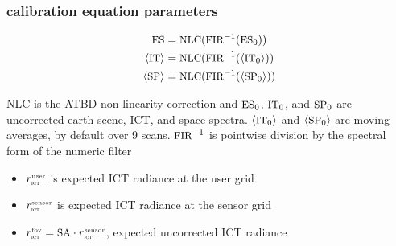 \documentclass[11pt]{beamer}
\begin{document}
\begin{frame}
\frametitle{calibration equation parameters}

\vspace{-8mm}
\begin{align*}
  \mbox{\small ES} &= \mbox{\small NLC}(\mbox{\small FIR}^{-1}(\mbox{\small ES}_0)) \\
  \langle\mbox{\small IT}\rangle &= \mbox{\small NLC}(\mbox{\small FIR}^{-1}(\langle\mbox{\small IT}_0\rangle)) \\
  \langle\mbox{\small SP}\rangle &= \mbox{\small NLC}(\mbox{\small FIR}^{-1}(\langle\mbox{\small SP}_0\rangle)) \\
\end{align*}
\vspace{-8mm}

{\small NLC} is the ATBD non-linearity correction and $\mbox{\small ES}_0$,
$\mbox{\small IT}_0$, and $\mbox{\small SP}_0$ are uncorrected earth-scene, ICT, and space
spectra.  $\langle\mbox{\small IT}_0\rangle$ and $\langle\mbox{\small SP}_0\rangle$ are moving
averages, by default over 9 scans.  $\mbox{\small FIR}^{-1}$ is pointwise division
by the spectral form of the numeric filter

\begin{itemize}
  \item $r_{\mbox{\tiny\textsc{ict}}}^{\mbox{\tiny user}}$ is expected ICT radiance at the user grid
  \item $r_{\mbox{\tiny\textsc{ict}}}^{\mbox{\tiny sensor}}$ is expected ICT radiance at the sensor grid
  \item $r_{\mbox{\tiny\textsc{ict}}}^{\mbox{\tiny fov}} = \mbox{\small SA} \cdot r_{\mbox{\tiny\textsc{ict}}}^{\mbox{\tiny sensor}}$, expected uncorrected ICT
    radiance 
\end{itemize}

\end{frame}
\end{document}
